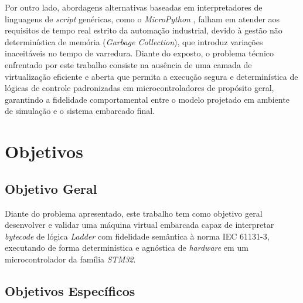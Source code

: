 Por outro lado, abordagens alternativas baseadas em interpretadores de linguagens de \textit{script} genéricas, como o \textit{MicroPython} \cite{micropython:2025}, falham em atender aos requisitos de tempo real estrito da automação industrial, devido à gestão não determinística de memória (\textit{Garbage Collection}), que introduz variações inaceitáveis no tempo de varredura.
Diante do exposto, o problema técnico enfrentado por este trabalho consiste na ausência de uma camada de virtualização eficiente e aberta que permita a execução segura e determinística de lógicas de controle padronizadas em microcontroladores de propósito geral, garantindo a fidelidade comportamental entre o modelo projetado em ambiente de simulação e o sistema embarcado final.


\section{Objetivos}
\label{sec:objetivo}

\subsection{Objetivo Geral}
\label{sec:objgeral}

Diante do problema apresentado, este trabalho tem como objetivo geral desenvolver e validar uma máquina virtual embarcada capaz de interpretar \textit{bytecode} de lógica \textit{Ladder} com fidelidade semântica à norma IEC 61131-3, executando de forma determinística e agnóstica de \textit{hardware} em um microcontrolador da família \textit{STM32}.

\subsection{Objetivos Específicos}
\label{sec:objespecificos}

